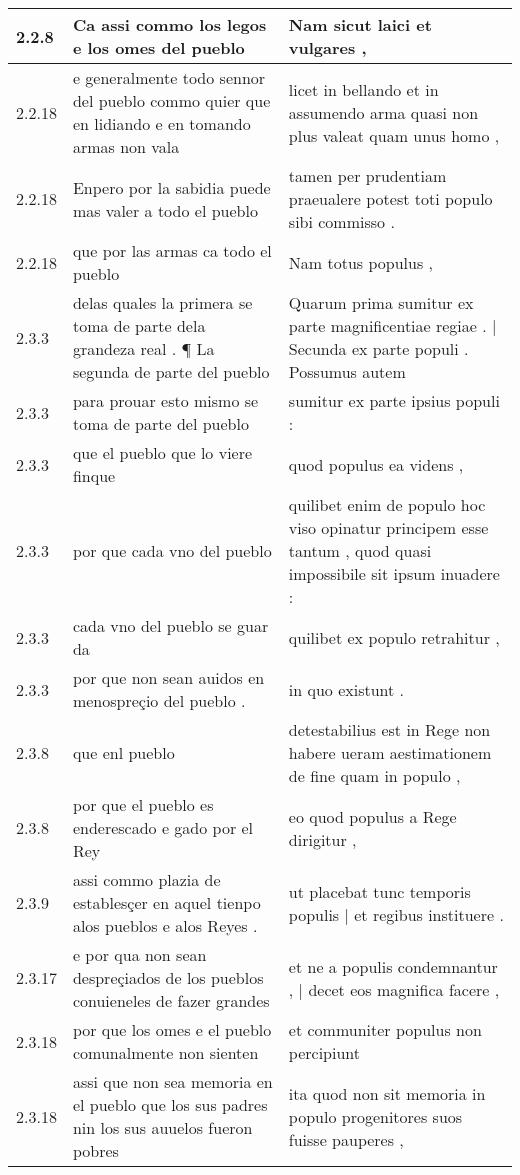 \begin{tabular}{|p{1cm}|p{6.5cm}|p{6.5cm}|}
2.2.8 & Ca assi commo los legos e los omes del pueblo & Nam sicut laici et vulgares , \\\hline
2.2.18 & e generalmente todo sennor del pueblo commo quier que en lidiando e en tomando armas non vala & licet in bellando et in assumendo arma quasi non plus valeat quam unus homo , \\\hline
2.2.18 & Enpero por la sabidia puede mas valer a todo el pueblo & tamen per prudentiam praeualere potest toti populo sibi commisso . \\\hline
2.2.18 & que por las armas ca todo el pueblo & Nam totus populus , \\\hline
2.3.3 & delas quales la primera se toma de parte dela grandeza real . ¶ La segunda de parte del pueblo & Quarum prima sumitur ex parte magnificentiae regiae . | Secunda ex parte populi . Possumus autem \\\hline
2.3.3 & para prouar esto mismo se toma de parte del pueblo & sumitur ex parte ipsius populi : \\\hline
2.3.3 & que el pueblo que lo viere finque & quod populus ea videns , \\\hline
2.3.3 & por que cada vno del pueblo & quilibet enim de populo hoc viso opinatur principem esse tantum , quod quasi impossibile sit ipsum inuadere : \\\hline
2.3.3 & cada vno del pueblo se guar da & quilibet ex populo retrahitur , \\\hline
2.3.3 & por que non sean auidos en menospreçio del pueblo . & in quo existunt . \\\hline
2.3.8 & que enl pueblo & detestabilius est in Rege non habere ueram aestimationem de fine quam in populo , \\\hline
2.3.8 & por que el pueblo es enderescado e gado por el Rey & eo quod populus a Rege dirigitur , \\\hline
2.3.9 & assi commo plazia de establesçer en aquel tienpo alos pueblos e alos Reyes . & ut placebat tunc temporis populis | et regibus instituere . \\\hline
2.3.17 & e por qua non sean despreçiados de los pueblos conuieneles de fazer grandes & et ne a populis condemnantur , | decet eos magnifica facere , \\\hline
2.3.18 & por que los omes e el pueblo comunalmente non sienten & et communiter populus non percipiunt \\\hline
2.3.18 & assi que non sea memoria en el pueblo que los sus padres nin los sus auuelos fueron pobres & ita quod non sit memoria in populo progenitores suos fuisse pauperes , \\\hline

\end{tabular}
